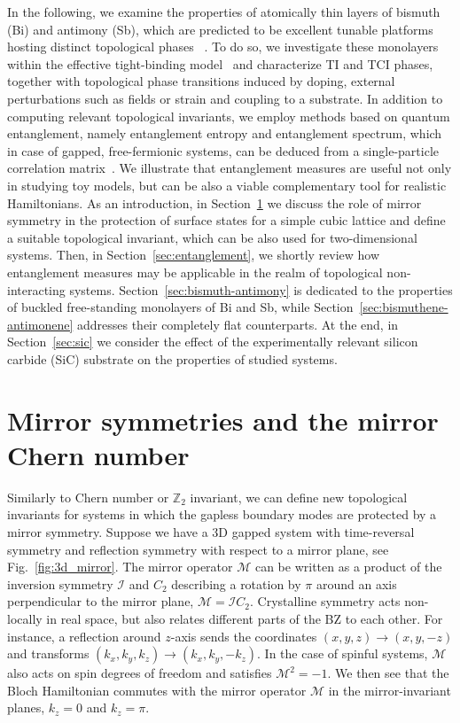 In the following, we examine the properties of atomically thin layers of bismuth (Bi) and antimony (Sb), which are predicted to be excellent tunable platforms hosting distinct topological phases ~\cite{Hsu2016, Wang_2017}. To do so, we investigate these monolayers within the effective tight-binding model~\cite{Liu:Allen} and characterize TI and TCI phases, together with topological phase transitions induced by doping, external perturbations such as fields or strain and coupling to a substrate. In addition to computing relevant topological invariants, we employ methods based on quantum entanglement, namely entanglement entropy and entanglement spectrum, which in case of gapped, free-fermionic systems, can be deduced from a single-particle correlation matrix~\cite{Peschel}. We illustrate that entanglement measures are useful not only in studying toy models, but can be also a viable complementary tool for realistic Hamiltonians. As an introduction, in Section~\ref{sec:mirror} we discuss the role of mirror symmetry in the protection of surface states for a simple cubic lattice and define a suitable topological invariant, which can be also used for two-dimensional systems. Then, in Section~\ref{sec:entanglement}, we shortly review how entanglement measures may be applicable in the realm of topological non-interacting systems. Section~\ref{sec:bismuth-antimony} is dedicated to the properties of buckled free-standing monolayers of Bi and Sb, while Section~\ref{sec:bismuthene-antimonene} addresses their completely flat counterparts. At the end, in Section~\ref{sec:sic} we consider the effect of the experimentally relevant silicon carbide (SiC) substrate on the properties of studied systems. 

\section{Mirror symmetries and the mirror Chern number}
\label{sec:mirror}
Similarly to Chern number or $\mathbb{Z}_2$ invariant, we can define new topological invariants for systems in which the gapless boundary modes are protected by a mirror symmetry. Suppose we have a 3D gapped system with time-reversal symmetry and reflection symmetry with respect to a mirror plane, see Fig.~\ref{fig:3d_mirror}. The mirror operator $\mathcal{M}$ can be written as a product of the inversion symmetry $\mathcal{I}$ and $C_2$ describing a rotation by $\pi$ around an axis perpendicular to the mirror plane, $\mathcal{M} = \mathcal{I} C_2$. Crystalline symmetry acts non-locally in real space, but also relates different parts of the BZ to each other. For instance, a reflection around $z$-axis sends the coordinates $(x, y, z) \rightarrow (x, y, -z)$ and transforms $(k_x, k_y, k_z) \rightarrow (k_x, k_y, -k_z)$. In the case of spinful systems, $\mathcal{M}$ also acts on spin degrees of freedom and satisfies $\mathcal{M}^2 = - 1$. We then see that the Bloch Hamiltonian commutes with the mirror operator $\mathcal{M}$ in the mirror-invariant planes, $k_z = 0$ and $k_z = \pi$. 


